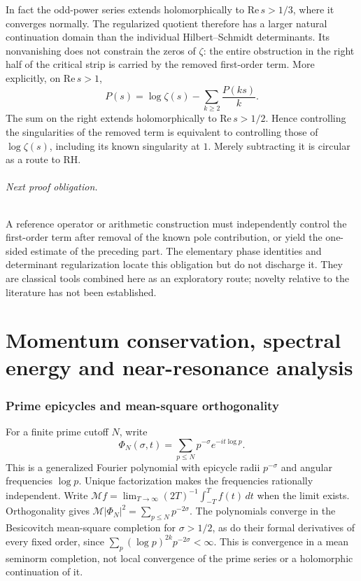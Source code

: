\documentclass[11pt,a4paper]{article}
\theoremstyle{definition}\newtheorem{definition}[proposition]{Definition}
\theoremstyle{remark}\newtheorem{remark}[proposition]{Remark}
\begin{document}
In fact the odd-power series extends holomorphically to $\mathrm{Re}\,s>1/3$, where it converges normally. The regularized quotient therefore has a larger natural continuation domain than the individual Hilbert--Schmidt determinants. Its nonvanishing does not constrain the zeros of $\zeta$: the entire obstruction in the right half of the critical strip is carried by the removed first-order term. More explicitly, on $\mathrm{Re}\,s>1$,
\[
P(s)=\log\zeta(s)-\sum_{k\ge2}\frac{P(ks)}{k}.
\]
The sum on the right extends holomorphically to $\mathrm{Re}\,s>1/2$. Hence controlling the singularities of the removed term is equivalent to controlling those of $\log\zeta(s)$, including its known singularity at $1$. Merely subtracting it is circular as a route to RH.

\paragraph{Next proof obligation.}
A reference operator or arithmetic construction must independently control the first-order term after removal of the known pole contribution, or yield the one-sided estimate of the preceding part. The elementary phase identities and determinant regularization locate this obligation but do not discharge it. They are classical tools combined here as an exploratory route; novelty relative to the literature has not been established.

\part{Momentum conservation, spectral energy and near-resonance analysis}

\section{Prime epicycles and mean-square orthogonality}
For a finite prime cutoff $N$, write
\[
\Phi_N(\sigma,t)=\sum_{p\le N}p^{-\sigma}e^{-it\log p}.
\]
This is a generalized Fourier polynomial with epicycle radii $p^{-\sigma}$ and angular frequencies $\log p$. Unique factorization makes the frequencies rationally independent. Write $\mathcal M f=\lim_{T\to\infty}(2T)^{-1}\int_{-T}^T f(t)\,dt$ when the limit exists. Orthogonality gives
$\mathcal M|\Phi_N|^2=\sum_{p\le N}p^{-2\sigma}$.
The polynomials converge in the Besicovitch mean-square completion for $\sigma>1/2$, as do their formal derivatives of every fixed order, since
$\sum_p(\log p)^{2k}p^{-2\sigma}<\infty$.
This is convergence in a mean seminorm completion, not local convergence of the prime series or a holomorphic continuation of it.
\end{document}
